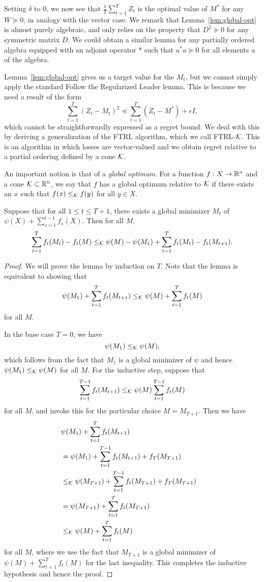 \documentclass[paper_icml.tex]{subfiles}
\begin{document}
Setting $\delta$ to $0$, we now see that $\frac{1}{T} \sum_{t=1}^T Z_t$ is the 
optimal value of $M^*$ for any $W \succeq 0$, in analogy with the vector case. We 
remark that Lemma~\ref{lem:global-opt} is almost purely algebraic, and only relies 
on the property that $D^2 \succeq 0$ for any symmetric matrix $D$. We could obtain 
a similar lemma for any partially ordered algebra equipped with an adjoint operator 
$*$ such that $a^{*}a \succeq 0$ for all elements $a$ of the algebra.

Lemma~\ref{lem:global-opt} gives us a target value for the $M_t$, but we cannot 
simply apply the standard Follow the Regularized Leader lemma. This is because 
we need a result of the form
\[ \sum_{t=1}^T (Z_t - M_t)^2 \preceq \sum_{t=1}^T (Z_t - M^*) + \epsilon I, \]
which cannot be straightforwardly expressed as a regret bound. We deal with this 
by deriving a generalization of the FTRL algorithm, which we call FTRL-$\mathcal{K}$. 
This is an algorithm in which losses are vector-valued and we obtain regret relative 
to a partial ordering defined by a cone $\mathcal{K}$.

An important notion is that of a \emph{global optimum}. For a function $f : X \to \mathbb{R}^n$ 
and a cone $\mathcal{K} \subset \mathbb{R}^n$, we say that $f$ has a global optimum relative to 
$\mathcal{K}$ if there exists an $x$ such that $f(x) \leq_{\mathcal{K}} f(y)$ for all $y \in X$.

\begin{lemma}
\label{lem:ftrl-k}
Suppose that for all $1 \leq t \leq T+1$, there 
exists a global minimizer $M_t$ of 
$\psi(X) + \sum_{s=1}^{t-1} f_s(X)$. Then for all $M$,
\[ \sum_{t=1}^T f_t(M_t)-f_t(M) \leq_{\mathcal{K}} \psi(M) - \psi(M_1) + \sum_{t=1}^T f_t(M_{t}) - f_t(M_{t+1}). \]
\end{lemma}
\begin{proof}
We will prove the lemma by induction on $T$. Note that the lemma is equivalent to showing that 
\[ \psi(M_1) + \sum_{t=1}^T f_t(M_{t+1}) \leq_{\mathcal{K}} \psi(M) + \sum_{t=1}^T f_t(M) \]
for all $M$.

In the base case $T = 0$, we have
\[ \psi(M_1) \leq_{\mathcal{K}} \psi(M), \]
which follows from the fact that $M_1$ is a global minimizer of $\psi$ and 
hence $\psi(M_1) \leq_{\mathcal{K}} \psi(M)$ for all $M$. For the inductive step, suppose that
\[ \sum_{t=1}^{T-1} f_t(M_{t+1}) \leq_{\mathcal{K}} \psi(M) \sum_{t=1}^{T-1} f_t(M) \]
for all $M$, and invoke this for the particular choice $M = M_{T+1}$. Then we have
\begin{align}
\lefteqn{\psi(M_1) + \sum_{t=1}^T f_t(M_{t+1})} \\
 &= \psi(M_1) + \sum_{t=1}^{T-1} f_t(M_{t+1}) + f_T(M_{T+1}) \\
 &\leq_{\sK} \psi(M_{T+1}) + \sum_{t=1}^{T-1} f_t(M_{T+1}) + f_T(M_{T+1}) \\
 &= \psi(M_{T+1}) + \sum_{t=1}^T f_t(M_{T+1}) \\
 &\leq_{\sK} \psi(M) + \sum_{t=1}^T f_t(M)
\end{align}
for all $M$, where we use the fact that $M_{T+1}$ is a global minimizer of $\psi(M) + \sum_{t=1}^T f_t(M)$ for 
the last inequality. This completes the inductive hypothesis and hence the proof.
\end{proof}
\end{document}
